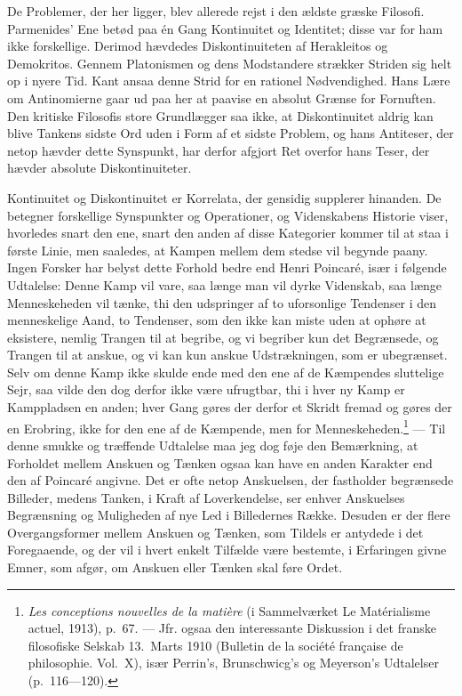\documentclass[12pt]{article}
\newcommand{\opage}[1]{\marginnote{\footnotesize\textit{[#1]}}}
\begin{document}
De Problemer, der her ligger, blev allerede rejst i den
ældste græske Filosofi. Parmenides' \guillemotright Ene\guillemotleft{} betød paa én
Gang Kontinuitet og Identitet; disse var for ham ikke forskellige.
Derimod hævdedes Diskontinuiteten af Herakleitos
og Demokritos. Gennem Platonismen og dens Modstandere
strækker Striden sig helt op i nyere Tid. Kant ansaa denne
Strid for en rationel Nødvendighed. Hans Lære om Antinomierne
gaar ud paa her at paavise en absolut Grænse
for Fornuften. Den kritiske Filosofis store Grundlægger saa
ikke, at Diskontinuitet aldrig kan blive Tankens sidste Ord
uden i Form af et sidste Problem, og hans \guillemotright Antiteser\guillemotleft, der
netop hævder dette Synspunkt, har derfor afgjort Ret overfor
hans \guillemotright Teser\guillemotleft, der hævder absolute Diskontinuiteter.

Kontinuitet og Diskontinuitet er Korrelata, der gensidig
supplerer hinanden. De betegner forskellige Synspunkter
og Operationer, og Videnskabens Historie viser, hvorledes
snart den ene, snart den anden af disse Kategorier kommer
til at staa i første Linie, men saaledes, at Kampen mellem
dem stedse vil begynde paany. Ingen Forsker har belyst
dette Forhold bedre end Henri Poincaré, især i følgende
Udtalelse: \guillemotright Denne Kamp vil vare, saa længe man vil dyrke
\opage{31} \setcounter{footnote}{0}
Videnskab, saa længe Menneskeheden vil tænke, thi den
udspringer af to uforsonlige Tendenser i den menneskelige
Aand, to Tendenser, som den ikke kan miste uden at ophøre
at eksistere, nemlig Trangen til at begribe, og vi begriber
kun det Begrænsede, og Trangen til at anskue, og
vi kan kun anskue Udstrækningen, som er ubegrænset.
Selv om denne Kamp ikke skulde ende med den ene af
de Kæmpendes sluttelige Sejr, saa vilde den dog derfor
ikke være ufrugtbar, thi i hver ny Kamp er Kamppladsen
en anden; hver Gang gøres der derfor et Skridt fremad og
gøres der en Erobring, ikke for den ene af de Kæmpende,
men for Menneskeheden.\guillemotleft\footnote{\textit{Les conceptions
nouvelles de la matière} (i Sammelværket \guillemotright Le
Matérialisme actuel\guillemotleft, 1913), p.~67. --- Jfr. ogsaa den interessante
Diskussion i det franske filosofiske Selskab 13.~Marts 1910 (Bulletin de la
société française de philosophie. Vol.~X), især Perrin's, Brunschwicg's og
Meyerson's Udtalelser (p.~116---120).} --- Til denne smukke og træffende
Udtalelse maa jeg dog føje den Bemærkning, at Forholdet
mellem Anskuen og Tænken ogsaa kan have en
anden Karakter end den af Poincaré angivne. Det er ofte
netop Anskuelsen, der fastholder begrænsede Billeder, medens
Tanken, i Kraft af Loverkendelse, ser enhver Anskuelses
Begrænsning og Muligheden af nye Led i Billedernes
Række. Desuden er der flere Overgangsformer mellem
Anskuen og Tænken, som Tildels er antydede i det
Foregaaende, og der vil i hvert enkelt Tilfælde være bestemte,
i Erfaringen givne Emner, som afgør, om Anskuen
eller Tænken skal føre Ordet.
\end{document}
